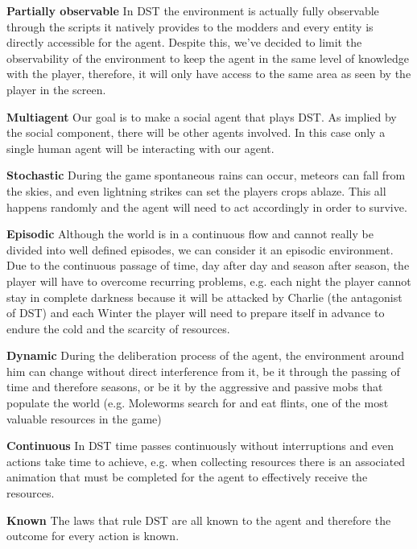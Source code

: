 \begin{description}
	\item \textbf{Partially observable} In \ac{DST} the environment is actually fully observable through the scripts it natively provides to the modders and every entity is directly accessible for the agent. Despite this, we've decided to limit the observability of the environment to keep the agent in the same level of knowledge with the player, therefore, it will only have access to the same area as seen by the player in the screen.
	\item \textbf{Multiagent} Our goal is to make a social agent that plays \ac{DST}.
	As implied by the social component, there will be other agents involved. 
	In this case only a single human agent will be interacting with our agent.
	\item \textbf{Stochastic} During the game spontaneous rains can occur, meteors can fall from the skies, and even lightning strikes can set the players crops ablaze. 
	This all happens randomly and the agent will need to act accordingly in order to survive.
	\item \textbf{Episodic} Although the world is in a continuous flow and cannot really be divided into well defined episodes, we can consider it an episodic environment. 
	Due to the continuous passage of time, day after day and season after season, the player will have to overcome recurring problems, e.g. each night the player cannot stay in complete darkness because it will be attacked by Charlie (the antagonist of \ac{DST}) and each Winter the player will need to prepare itself in advance to endure the cold and the scarcity of resources.
	\item \textbf{Dynamic} During the deliberation process of the agent, the environment around him can change without direct interference from it, be it through the passing of time and therefore seasons, or be it by the aggressive and passive mobs that populate the world (e.g. Moleworms search for and eat flints, one of the most valuable resources in the game)
	\item \textbf{Continuous} In \ac{DST} time passes continuously without interruptions and even actions take time to achieve, e.g. when collecting resources there is an associated animation that must be completed for the agent to effectively receive the resources.
	\item \textbf{Known} The laws that rule \ac{DST} are all known to the agent and therefore the outcome for every action is known.
\end{description}

